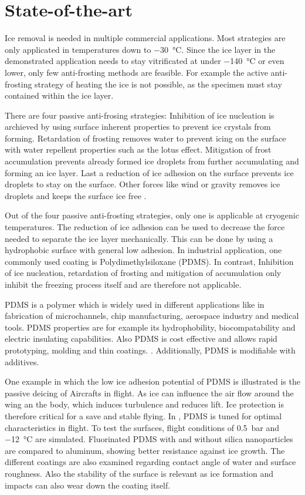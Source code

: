 \section{State-of-the-art}

Ice removal is needed in multiple commercial applications. Most strategies are only applicated in temperatures down to \SI{-30}{\degreeCelsius}. Since the ice layer in the demonstrated application needs to stay vitrificated at under \SI{-140}{\degreeCelsius} or even lower, only few anti-frosting methods are feasible. For example the active anti-frosting strategy of heating the ice is not possible, as the specimen must stay contained within the ice layer.

There are four passive anti-frosing strategies: Inhibition of ice nucleation is archieved by using surface inherent properties to prevent ice crystals from forming. Retardation of frosting removes water to prevent icing on the surface with water repellent properties such as the lotus effect. Mitigation of frost accumulation prevents already formed ice droplets from further accumulating and forming an ice layer. Last a reduction of ice adhesion on the surface prevents ice droplets to stay on the surface. Other forces like wind or gravity removes ice droplets and keeps the surface ice free \cite{Yang.2021}. 

Out of the four passive anti-frosting strategies, only one is applicable at cryogenic temperatures. The reduction of ice adhesion can be used to decrease the force needed to separate the ice layer mechanically. This can be done by using a hydrophobic surface with general low adhesion. In industrial application, one commonly used coating is Polydimethylsiloxane (PDMS). In contrast, Inhibition of ice nucleation, retardation of frosting and mitigation of accumulation only inhibit the freezing process itself and are therefore not applicable.

PDMS is a polymer which is widely used in different applications like in fabrication of microchannels, chip manufacturing, aerospace industry and medical tools. PDMS properties are for example its hydrophobility, biocompatability and electric insulating capabilities. Also PDMS is cost effective and allows rapid prototyping, molding and thin coatings. \cite{Wolf.2018}. Additionally, PDMS is modifiable with additives.

One example in which the low ice adhesion potential of PDMS is illustrated is the passive deicing of Aircrafts in flight. As ice can influence the air flow around the wing an the body, which induces turbulence and reduces lift. Ice protection is therefore critical for a save and stable flying. In \cite{Liu.2018}, PDMS is tuned for optimal characteristics in flight. To test the surfaces, flight conditions of \SI{0.5}{\bar} and \SI{-12}{\degreeCelsius} are simulated. Fluorinated PDMS with and without silica nanoparticles are compared to aluminum, showing better resistance against ice growth. The different coatings are also examined regarding contact angle of water and surface roughness. Also the stability of the surface is relevant as ice formation and impacts can also wear down the coating itself. 

